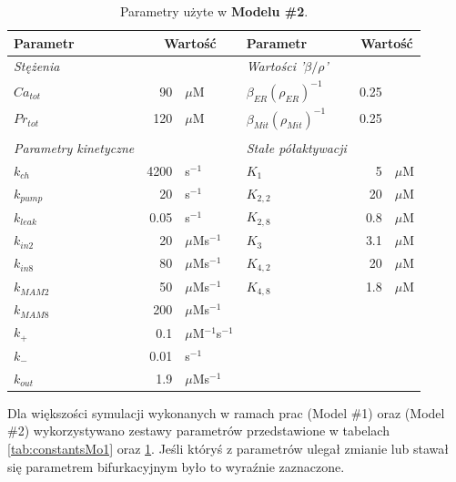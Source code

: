 \bigskip

\begin{table}[ht]
\centering
\begin{tabular} {@{} l r l l r l @{}}
\toprule[0.12em]
\rule{0pt}{3ex} \textbf{Parametr} 	& \multicolumn{2}{c}{\textbf{Wartość}} 	& \textbf{Parametr} &\multicolumn{2}{c}{\textbf{Wartość}} \\\midrule[0.06em]
\textit{Stężenia}	       	&	              	& 	    		& \textit{Wartości '$\beta/\rho$'}	&	   &	\\
$Ca_{tot}$							&	90	  	& $\mu$M				&	$\beta_{ER}(\rho_{ER})^{-1}$						&	0.25 &	\\
$Pr_{tot}$							&	120		& $\mu$M				&	$\beta_{Mit}(\rho_{Mit})^{-1}$						&	0.25 &	\\
									&			&						& 					&				&								\\
 \textit{Parametry kinetyczne} 	  &			& 		     		& \textit{Stałe półaktywacji}    & &		   \\
$k_{ch}$							& 4200		& s$^{-1}$ 				& $K_{1}$              & 5  & $\mu$M \\
$k_{pump}$							& 20 		& s$^{-1}$ 				& $K_{2,2}$             & 20 & $\mu$M \\
$k_{leak}$							& 0.05 	& s$^{-1}$ 				& $K_{2,8}$ 				    & 0.8 & $\mu$M \\
$k_{in2}$							& 20		& $\mu$Ms$^{-1}$		& $K_{3}$              & 3.1 & $\mu$M \\
$k_{in8}$							& 80 		& $\mu$Ms$^{-1}$		& $K_{4,2}$	            & 20 & $\mu$M \\
$k_{MAM2}$							& 50		& $\mu$Ms$^{-1}$		& $K_{4,8}$             & 1.8 & $\mu$M \\
$k_{MAM8}$							& 200		& $\mu$Ms$^{-1}$	  &                  &   &    \\
$k_{+}$								& 0.1		& $\mu$M$^{-1}$s$^{-1}$	& 					        &   &    \\
$k_{-}$								& 0.01 		& s$^{-1}$				&                  &   &    \\
$k_{out}$							& 1.9 		& $\mu$Ms$^{-1}$ 		& 					        &   &    \\
\bottomrule[0.12em]
\end{tabular}
\caption[Parametry użyte w Modelu \#2]{Parametry użyte w \textbf{Modelu \#2}.}
\label{tab:constantsMo2}
\end{table}



Dla większości symulacji wykonanych w ramach prac \cite{Dyzma2012} (Model \#1) oraz \cite{Szopa2013} (Model \#2) wykorzystywano zestawy parametrów przedstawione w tabelach \ref{tab:constantsMo1} oraz \ref{tab:constantsMo2}. Jeśli któryś z parametrów ulegał zmianie lub stawał się parametrem bifurkacyjnym było to wyraźnie zaznaczone.